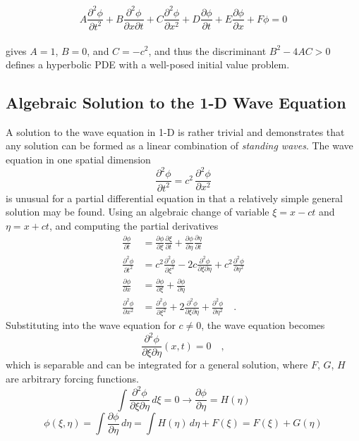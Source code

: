 \documentclass{homework}
\begin{document}
\[ A \frac{\partial^2 \phi}{\partial t^2} + B \frac{\partial^2 \phi}{\partial x \partial t} + C \frac{\partial^2 \phi}{\partial x^2} + D \frac{\partial \phi}{\partial t} + E \frac{\partial \phi}{\partial x} + F \phi = 0 \]
\\ \noindent
gives $A = 1$, $B = 0$, and $C = -c^2$, and thus the discriminant $B^2 - 4AC > 0$ defines a hyperbolic PDE with a well-posed initial value problem.

\subsection{Algebraic Solution to the 1-D Wave Equation}
A solution to the wave equation in 1-D is rather trivial and demonstrates that any solution can be formed as a linear combination of \emph{standing waves}. The wave equation in one spatial dimension
\[ \frac{\partial^2 \phi}{\partial t^2} = c^2 \, \frac{\partial^2 \phi}{\partial x^2} \]
\noindent
is unusual for a partial differential equation in that a relatively simple general solution may be found. Using an algebraic change of variable $\xi = x - ct$ and  $\eta = x + ct$, and computing the partial derivatives
\begin{align*}
\frac{\partial \phi}{\partial t} &= \frac{\partial \phi}{\partial \xi} \frac{\partial \xi}{\partial t} + \frac{\partial \phi}{\partial \eta} \frac{\partial \eta}{\partial t}
\\
\frac{\partial^2 \phi}{\partial t^2} &= c^2 \frac{\partial^2 \phi}{\partial \xi^2} -2c \frac{\partial^2 \phi}{\partial \xi \partial \eta} + c^2 \frac{\partial^2 \phi}{\partial \eta^2}
\\[8pt]
\frac{\partial \phi}{\partial x} &= \frac{\partial \phi}{\partial \xi} + \frac{\partial \phi}{\partial \eta}
\\
\frac{\partial^2 \phi}{\partial x^2} &= \frac{\partial^2 \phi}{\partial \xi^2} + 2 \frac{\partial^2 \phi}{\partial \xi \partial \eta} + \frac{\partial^2 \phi}{\partial \eta^2} \quad .
\end{align*}
\noindent
Substituting into the wave equation for $c \neq 0$, the wave equation becomes
\[ \frac{\partial^2 \phi}{\partial \xi \partial \eta }(x,t) = 0 \quad ,\]
which is separable and can be integrated for a general solution, where $F$, $G$, $H$ are arbitrary forcing functions.
\[ \int \frac{\partial^2 \phi}{\partial \xi \partial \eta } \, d \xi = 0 \rightarrow \frac{\partial \phi}{\partial \eta} = H(\eta) \]
\[ \phi(\xi, \eta) = \int \frac{\partial \phi}{\partial \eta} \, d \eta = \int H(\eta) \, d \eta + F(\xi) = F(\xi ) + G(\eta ) \]
\end{document}

